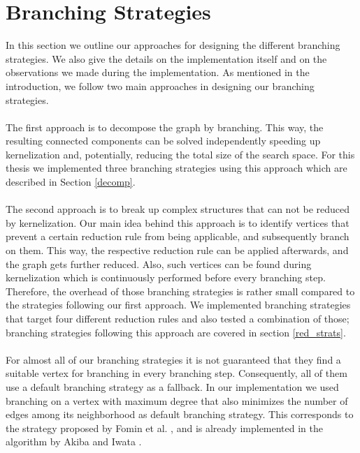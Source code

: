 \documentclass[12pt,a4paper,twoside]{scrartcl}
\numberwithin{equation}{section}
\begin{document}
\section{Branching Strategies} \label{sec4}
In this section we outline our approaches for designing the different branching strategies. We also give the details on the implementation itself and on the observations we made during the implementation. As mentioned in the introduction, we follow two main approaches in designing our branching strategies. 
\paragraph{}
The first approach is to decompose the graph by branching. This way, the resulting connected components can be solved independently speeding up kernelization and, potentially, reducing the total size of the search space. For this thesis we implemented three branching strategies using this approach which are described in Section \ref{decomp}.
\paragraph{}
The second approach is to break up complex structures that can not be reduced by kernelization. Our main idea behind this approach is to identify vertices that prevent a certain reduction rule from being applicable, and subsequently branch on them. This way, the respective reduction rule can be applied afterwards, and the graph gets further reduced. Also, such vertices can be found during kernelization which is continuously performed before every branching step. Therefore, the overhead of those branching strategies is rather small compared to the strategies following our first approach. We implemented branching strategies that target four different reduction rules and also tested a combination of those; branching strategies following this approach are covered in section \ref{red_strats}.
\paragraph{}

For almost all of our branching strategies it is not guaranteed that they find a suitable vertex for branching in every branching step. Consequently, all of them use a default branching strategy as a fallback. In our implementation we used branching on a vertex with maximum degree that also minimizes the number of edges among its neighborhood  as default branching strategy. This corresponds to the strategy proposed by Fomin et al. \cite{Fomin}, and is already implemented in the algorithm by Akiba and Iwata \cite{AkibaIwata}.
\end{document}
